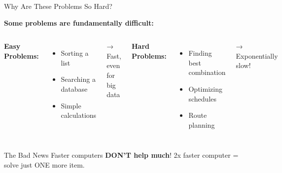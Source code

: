 \documentclass[aspectratio=169]{beamer}
\begin{document}
\begin{frame}{Why Are These Problems So Hard?}
\begin{center}
\textbf{Some problems are fundamentally difficult:}
\end{center}

\vspace{0.3cm}

\begin{columns}
\textbf{Easy Problems:}
\begin{itemize}
    \item Sorting a list
    \item Searching a database
    \item Simple calculations
\end{itemize}
\textcolor{aigreen}{→ Fast, even for big data}

\vspace{0.5cm}
\textbf{Hard Problems:}
\begin{itemize}
    \item Finding best combination
    \item Optimizing schedules
    \item Route planning
\end{itemize}
\textcolor{aired}{→ Exponentially slow!}

\end{columns}

\vspace{0.5cm}
\begin{alertblock}{The Bad News}
Faster computers \textbf{DON'T help much}! 2x faster computer = solve just ONE more item.
\end{alertblock}
\end{frame}

\end{document}

